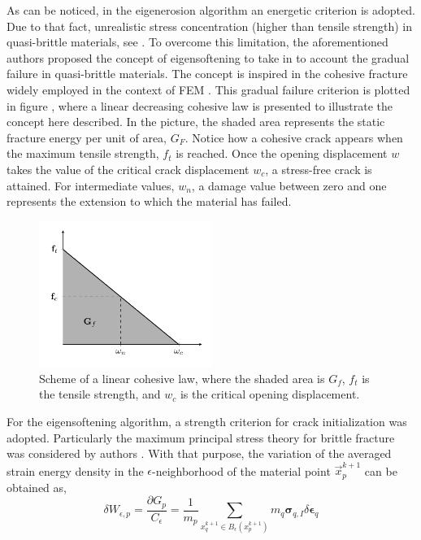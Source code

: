 \documentclass[preprint,12pt,a4paper]{elsarticle}
\newcommand{\tens}[1]{
  \ensuremath{\mathbf{{#1}}}
}
\begin{document}
As can be noticed, in the eigenerosion algorithm an energetic
criterion is adopted. Due to that fact, unrealistic stress
concentration (higher than tensile strength) in quasi-brittle materials, see
\cite{Navas_2017_ES}. To overcome this limitation, the aforementioned
authors proposed the concept of eigensoftening to take in to account
the gradual failure in quasi-brittle materials. The concept is
inspired in the cohesive fracture widely employed in the context of
FEM \cite{Ortiz_1999}. This gradual failure criterion is plotted in
figure \label{fig:Damage-ft-wc}, where a linear decreasing cohesive
law is presented to illustrate the concept here described. In the
picture, the shaded area represents the static fracture energy per
unit of area, $G_F$. Notice how a cohesive crack appears when the
maximum tensile strength, $f_t$ is reached. Once the opening
displacement $w$ takes the value of the critical crack displacement
$w_c$, a stress-free crack is attained. For intermediate values,
$w_n$, a damage value between zero and one represents the extension to
which the material has failed.
\begin{figure}
  \centering
  \includegraphics[width=0.5\textwidth]{Figures/Damage}
  \caption{Scheme of a linear cohesive law, where the shaded area is
    $G_f$, $f_t$ is the tensile strength, and $w_c$ is the critical
    opening displacement.}
  \label{fig:Damage-ft-wc}
\end{figure}
For the eigensoftening algorithm, a strength criterion for crack
initialization was adopted. Particularly the maximum principal stress
theory for brittle fracture was considered by authors
\cite{Navas_2017_ES}. With that purpose, the variation of the averaged strain
energy density in the $\epsilon$-neighborhood of the material point
$\vec{x}_p^{k+1}$ can be obtained as,
\begin{equation}
  \label{eq:variation-averaged-strain-energy-density}
  \delta W_{\epsilon,p} = \frac{\partial G_p}{C_{\epsilon}} =
  \frac{1}{m_p} \sum_{x_q^{k+1} \in
  B_{\epsilon}(x_p^{k+1})} m_q \tens{\sigma}_{q,I} \delta \tens{\epsilon}_q
\end{equation}
\end{document}
